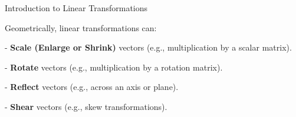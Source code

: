 \documentclass[10pt, aspectratio=169]{beamer}
\begin{document}
\begin{frame}{Introduction to Linear Transformations}
\begin{center}\setlength{\fboxsep}{10pt}
\end{center}

Geometrically, linear transformations can:

- \textbf{Scale (Enlarge or Shrink)} vectors (e.g., multiplication by a scalar matrix).

- \textbf{Rotate} vectors (e.g., multiplication by a rotation matrix).

- \textbf{Reflect} vectors (e.g., across an axis or plane).

- \textbf{Shear} vectors (e.g., skew transformations).

\end{frame}
\end{document}
